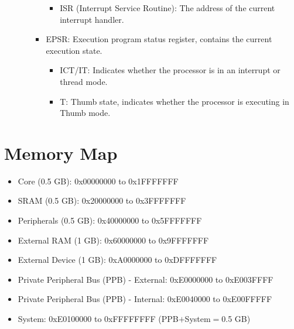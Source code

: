 \documentclass[a4paper,12pt,openany]{book}
\begin{document}
\begin{itemize}
\begin{itemize}
\begin{itemize}
            \begin{itemize}
                \item ISR (Interrupt Service Routine): The address of the current interrupt handler.
            \end{itemize}
            \item EPSR: Execution program status register, contains the current execution state.
            \begin{itemize}
                \item ICT/IT: Indicates whether the processor is in an interrupt or thread mode.
                \item T: Thumb state, indicates whether the processor is executing in Thumb mode.
            \end{itemize}
        \end{itemize}
    \end{itemize}
\end{itemize}

\section{Memory Map}
\begin{itemize}
    \item Core (0.5 GB): 0x00000000 to 0x1FFFFFFF
    \item SRAM (0.5 GB): 0x20000000 to 0x3FFFFFFF
    \item Peripherals (0.5 GB): 0x40000000 to 0x5FFFFFFF
    \item External RAM (1 GB): 0x60000000 to 0x9FFFFFFF
    \item External Device (1 GB): 0xA0000000 to 0xDFFFFFFF
    \item Private Peripheral Bus (PPB) - External: 0xE0000000 to 0xE003FFFF
    \item Private Peripheral Bus (PPB) - Internal: 0xE0040000 to 0xE00FFFFF
    \item System: 0xE0100000 to 0xFFFFFFFF (PPB$+$System$=$0.5 GB)
\end{itemize}
\end{document}
